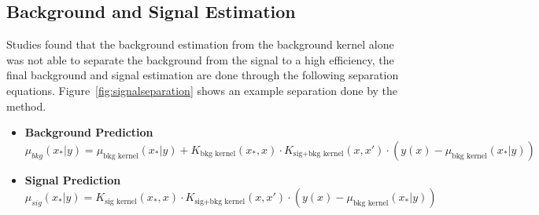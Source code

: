 \subsection{Background and Signal Estimation}
Studies found that the background estimation from the background kernel alone was not able to separate the background from the signal to a high efficiency, the final background and signal estimation are done through the following separation equations. Figure~\ref{fig:signalseparation} shows an example separation done by the method.

\begin{itemize}
    \item \textbf{Background Prediction}
    \begin{equation}
        \mu_{bkg}(x_{*}|y) = \mu_{\textrm{bkg kernel}}(x_{*}|y)+K_{\textrm{bkg kernel}}(x_{*}, x) \cdot K_{\textrm{sig+bkg kernel}}(x,x') \cdot( y(x)-\mu_{\textrm{bkg kernel}}(x_{*}|y) )
    \end{equation}


    \item \textbf{Signal Prediction}
    \begin{equation}
        \mu_{sig}(x_{*}|y) = K_{\textrm{sig kernel}}(x_{*}, x)\cdot K_{\textrm{sig+bkg kernel}}(x,x') \cdot ( y(x)-\mu_{\textrm{bkg kernel}}(x_{*}|y) )
    \end{equation}

\end{itemize}

